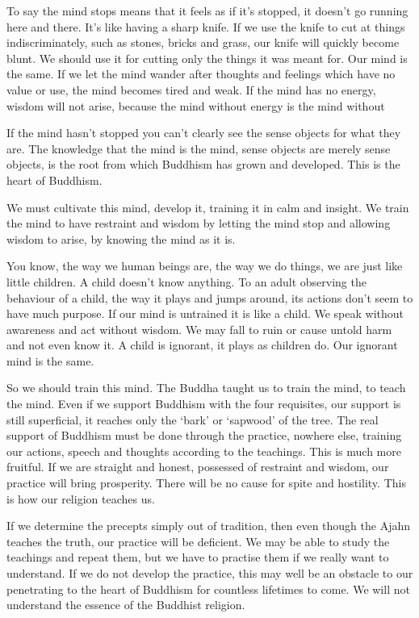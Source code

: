 To say the mind stops means that it feels as if it's stopped, it doesn't go running here and there. It's like having a sharp knife. If we use the knife to cut at things indiscriminately, such as stones, bricks and grass, our knife will quickly become blunt. We should use it for cutting only the things it was meant for. Our mind is the same. If we let the mind wander after thoughts and feelings which have no value or use, the mind becomes tired and weak. If the mind has no energy, wisdom will not arise, because the mind without energy is the mind without  

If the mind hasn't stopped you can't clearly see the sense objects for what they are. The knowledge that the mind is the mind, sense objects are merely sense objects, is the root from which Buddhism has grown and developed. This is the heart of Buddhism. 

We must cultivate this mind, develop it, training it in calm and insight. We train the mind to have restraint and wisdom by letting the mind stop and allowing wisdom to arise, by knowing the mind as it is. 

You know, the way we human beings are, the way we do things, we are just like little children. A child doesn't know anything. To an adult observing the behaviour of a child, the way it plays and jumps around, its actions don't seem to have much purpose. If our mind is untrained it is like a child. We speak without awareness and act without wisdom. We may fall to ruin or cause untold harm and not even know it. A child is ignorant, it plays as children do. Our ignorant mind is the same. 

So we should train this mind. The Buddha taught us to train the mind, to teach the mind. Even if we support Buddhism with the four requisites, our support is still superficial, it reaches only the `bark' or `sapwood' of the tree. The real support of Buddhism must be done through the practice, nowhere else, training our actions, speech and thoughts according to the teachings. This is much more fruitful. If we are straight and honest, possessed of restraint and wisdom, our practice will bring prosperity. There will be no cause for spite and hostility. This is how our religion teaches us. 

If we determine the precepts simply out of tradition, then even though the Ajahn teaches the truth, our practice will be deficient. We may be able to study the teachings and repeat them, but we have to practise them if we really want to understand. If we do not develop the practice, this may well be an obstacle to our penetrating to the heart of Buddhism for countless lifetimes to come. We will not understand the essence of the Buddhist religion. 


